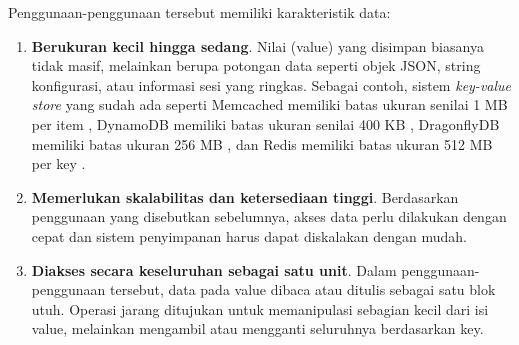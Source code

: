 Penggunaan-penggunaan tersebut memiliki karakteristik data:
\begin{enumerate}
  \item \textbf{Berukuran kecil hingga sedang}. Nilai (value) yang disimpan biasanya tidak masif, melainkan berupa potongan data seperti objek JSON, string konfigurasi, atau informasi sesi yang ringkas. Sebagai contoh, sistem \textit{key-value store} yang sudah ada seperti Memcached memiliki batas ukuran senilai 1 MB per item \parencite{memcached_docs}, DynamoDB memiliki batas ukuran senilai 400 KB \parencite{dynamodb_docs}, DragonflyDB memiliki batas ukuran 256 MB \parencite{dragonflydb_docs}, dan Redis memiliki batas ukuran 512 MB per key \parencite{redis_docs}.
  \item \textbf{Memerlukan skalabilitas dan ketersediaan tinggi}. Berdasarkan penggunaan yang disebutkan sebelumnya, akses data perlu dilakukan dengan cepat dan sistem penyimpanan harus dapat diskalakan dengan mudah.
  \item \textbf{Diakses secara keseluruhan sebagai satu unit}. Dalam penggunaan-penggunaan tersebut, data pada value dibaca atau ditulis sebagai satu blok utuh. Operasi jarang ditujukan untuk memanipulasi sebagian kecil dari isi value, melainkan mengambil atau mengganti seluruhnya berdasarkan key.
\end{enumerate}

